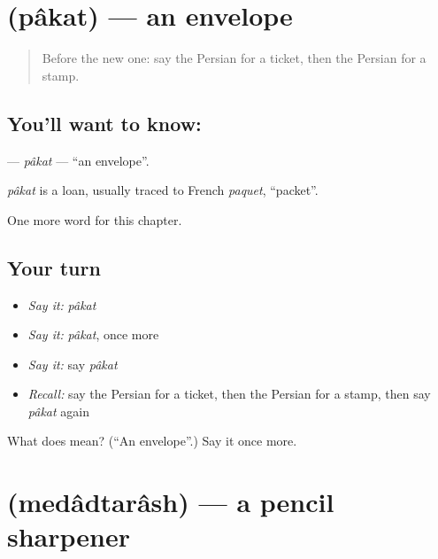 \section[\texorpdfstring{\fa{پاکت} (pâkat)}{پاکت (pâkat)}]{ (pâkat) — an envelope}

\label{lesson:FA-C113-pakat}



\begin{quote}
Before the new one: say the Persian for a ticket, then the Persian for a stamp.
\end{quote}

\subsection*{You'll want to know: }
\textbf{} — \emph{pâkat} — \textquotedblleft{}an envelope\textquotedblright{}.

\begin{cousinweb}
\emph{pâkat} is a loan, usually traced to French \emph{paquet}, \textquotedblleft{}packet\textquotedblright{}.
\end{cousinweb}

\begin{grammarlens}[title={What you've built}]
One more word for this chapter.
\end{grammarlens}

\subsection*{Your turn}
\begin{itemize}
\raggedright
  \item \emph{Say it:} \emph{pâkat}
  \item \emph{Say it:} \emph{pâkat}, once more
  \item \emph{Say it:} say \emph{pâkat}
  \item \emph{Recall:} say the Persian for a ticket, then the Persian for a stamp, then say \emph{pâkat} again
\end{itemize}

\begin{tcolorbox}[breakable,colback=teal!4,colframe=teal!35!black,title={Before you move on}]
What does  mean? (\textquotedblleft{}An envelope\textquotedblright{}.) Say it once more.
\end{tcolorbox}
\section[\texorpdfstring{\fa{مدادتراش} (medâdtarâsh)}{مدادتراش (medâdtarâsh)}]{ (medâdtarâsh) — a pencil sharpener}

